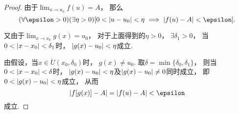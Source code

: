 \begin{theorem}
\begin{proof}
由于\(\lim_{u \to u_0} f(u) = A\)，
那么\[
	(\forall\epsilon>0)
	(\exists\eta>0)
	[
		0 < \abs{u - u_0} < \eta
		\implies
		\abs{ f(u) - A } < \epsilon
	].
\]

又由于\(\lim_{x \to x_0} g(x) = u_0\)，
对于上面得到的\(\eta > 0\)，
\(\exists \delta_1 > 0\)，
当\(0 < \abs{x - x_0} < \delta_1\)时，
\(\abs{ g(x) - u_0 } < \eta\)成立.

由假设，当\(x \in \mathring{U}(x_0,\delta_0)\)时，
\(g(x) \neq u_0\).
取\(\delta = \min\{\delta_0,\delta_1\}\)，
则当\(0 < \abs{x - x_0} < \delta\)时，
\(\abs{ g(x) - u_0 } < \eta\)及\(\abs{ g(x) - u_0 } \neq 0\)同时成立，
即\(0 < \abs{ g(x) - u_0 } < \eta\)成立，
从而\[
	\abs{ f[g(x)] - A } = \abs{ f(u) - A } < \epsilon
\]成立.
\end{proof}
\end{theorem}
